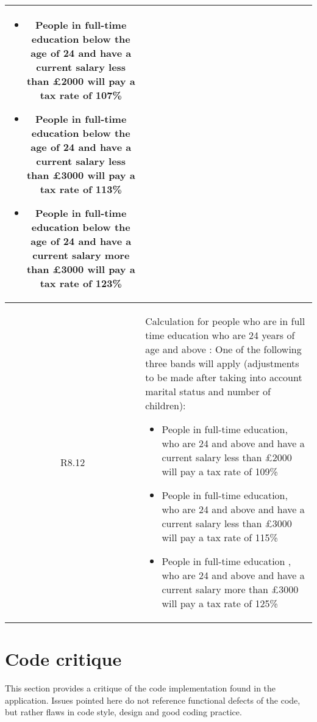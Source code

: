 \begin{table}[H]
\begin{tabularx}{\textwidth}{| c | X |}
    \begin{itemize}[itemsep=\tableitemsep, leftmargin=\tableleftsep]
        \item People in full-time education below the age of 24 and have a current salary less than £2000 will pay a tax rate of 107\%
        \item People in full-time education below the age of 24 and have a current salary less than £3000 will pay a tax rate of 113\%
        \item People in full-time education below the age of 24 and have a current salary more than £3000 will pay a tax rate of 123\%
    \end{itemize}
    \\
    \hline %
    R8.12 & Calculation for people who are in full time education who are 24 years of age and above : One of the following three bands will apply (adjustments to be made after taking into account marital status and number of children):
    \begin{itemize}[itemsep=\tableitemsep, leftmargin=\tableleftsep]
    \item People in full-time education, who are 24 and above and have a current salary less than £2000 will pay a tax rate of 109\%
    \item People in full-time education, who are 24 and above and have a current salary less than £3000 will pay a tax rate of 115\%
    \item People in full-time education , who are 24 and above and have a current salary more than £3000 will pay a tax rate of 125\%
    \end{itemize}
    \\
    \hline %
\end{tabularx}
\end{table}

\pagebreak
\section{Code critique}
\label{app:code-critique}
This section provides a critique of the code implementation found in the application. Issues pointed here do not reference functional defects of the code, but rather flaws in code style, design and good coding practice. 

